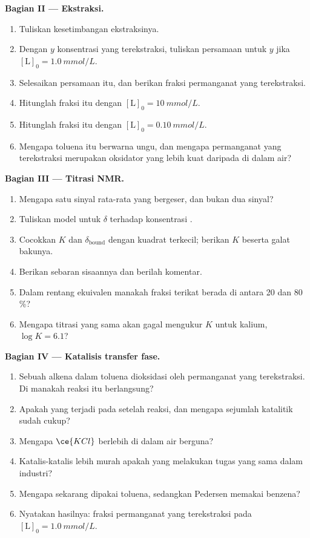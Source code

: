 \begin{problem}
\medskip\noindent\textbf{Bagian II --- Ekstraksi.}
\begin{enumerate}[resume, beginpenalty=10000]
  \item Tuliskan kesetimbangan ekstraksinya.
  \item Dengan $y$ konsentrasi yang terekstraksi, tuliskan persamaan untuk $y$ jika
        $[\mathrm L]_0 = \qty{1.0}{mmol/L}$.
  \item Selesaikan persamaan itu, dan berikan fraksi permanganat yang terekstraksi.
  \item Hitunglah fraksi itu dengan $[\mathrm L]_0 = \qty{10}{mmol/L}$.
  \item Hitunglah fraksi itu dengan $[\mathrm L]_0 = \qty{0.10}{mmol/L}$.
  \item Mengapa toluena itu berwarna ungu, dan mengapa permanganat yang terekstraksi merupakan oksidator
        yang lebih kuat daripada di dalam air?
\end{enumerate}

\medskip\noindent\textbf{Bagian III --- Titrasi NMR.}
\begin{enumerate}[resume, beginpenalty=10000]
  \item Mengapa satu sinyal rata-rata yang bergeser, dan bukan dua sinyal?
  \item Tuliskan model untuk $\delta$ terhadap konsentrasi .
  \item Cocokkan $K$ dan $\delta_{\mathrm{bound}}$ dengan kuadrat terkecil; berikan $K$ beserta galat bakunya.
  \item Berikan sebaran sisaannya dan berilah komentar.
  \item Dalam rentang ekuivalen manakah fraksi terikat berada di antara 20 dan 80\,\%?
  \item Mengapa titrasi yang sama akan gagal mengukur $K$ untuk kalium, $\log K = 6.1$?
\end{enumerate}

\medskip\noindent\textbf{Bagian IV --- Katalisis transfer fase.}
\begin{enumerate}[resume, beginpenalty=10000]
  \item Sebuah alkena dalam toluena dioksidasi oleh permanganat yang terekstraksi. Di manakah
        reaksi itu berlangsung?
  \item Apakah yang terjadi pada  setelah reaksi, dan mengapa sejumlah katalitik
        sudah cukup?
  \item Mengapa $\ce{KCl}$ berlebih di dalam air berguna?
  \item Katalis-katalis lebih murah apakah yang melakukan tugas yang sama dalam industri?
  \item Mengapa sekarang dipakai toluena, sedangkan Pedersen memakai benzena?
  \item Nyatakan hasilnya: fraksi permanganat yang terekstraksi pada
        $[\mathrm L]_0 = \qty{1.0}{mmol/L}$.
\end{enumerate}
\end{problem}
